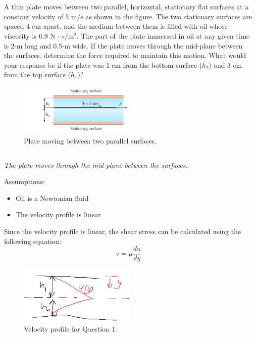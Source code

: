 \section{}
A thin plate moves between two parallel, horizontal, stationary flat 
surfaces at a constant velocity of 5 m/s as shown in the figure. The two 
stationary surfaces are spaced 4 cm apart, and the medium between them is 
filled with oil whose viscosity is 0.9 N $\cdot$ s/m$^2$. The part of the
plate immersed in oil at any given time is 2-m long and 0.5-m wide. If the
plate moves through the mid-plane between the surfaces, determine the force
required to maintain this motion. What would your response be if the plate
was 1 cm from the bottom surface ($h_2$) and 3 cm from the top surface ($h_1$)?

\begin{figure}[h]
    \centering
    \includegraphics[width=0.5\textwidth]{Questions/Figures/Q1ProblemDiagram.png}
    \caption{Plate moving between two parallel surfaces.}
    \label{fig:Q1ProblemDiagram}
\end{figure}

\subsection{}
\textit{The plate moves through the mid-plane between the surfaces.}

Assumptions:
\begin{itemize}
    \item Oil is a Newtonian fluid
    \item The velocity profile is linear
\end{itemize}

Since the velocity profile is linear, the shear stress can be calculated using
the following equation:
\begin{equation}
    \tau = \mu \frac{du}{dy}
    \label{eq:ShearStress}
\end{equation}

\begin{figure}[h]
    \centering
    \includegraphics[width=0.5\textwidth]{Questions/Figures/Q1LinearVelocityProfile.png}
    \caption{Velocity profile for Question 1.}
    \label{fig:Q1VelocityProfile}
\end{figure}

